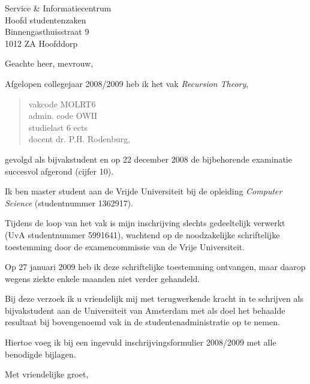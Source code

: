 \documentclass[a4paper,11pt]{brief}
\date{8 juli 2009}
\begin{document}
\begin{letter}{Service \& Informatiecentrum\\
Hoofd studentenzaken\\
Binnengasthuisstraat 9\\
1012 ZA Hoofddorp}

\opening{Geachte heer, mevrouw,}

Afgelopen collegejaar 2008/2009 heb ik het vak \emph{Recursion Theory},
\begin{quote}
vakcode MOLRT6\\
admin. code OWII\\
studielast 6 ects\\
docent dr. P.H. Rodenburg,
\end{quote}
gevolgd als bijvakstudent en op 22 december 2008 de bijbehorende
examinatie succesvol afgerond (cijfer 10).

Ik ben master student aan de Vrijde Universiteit bij de opleiding
\emph{Computer Science} (studentnummer 1362917).

Tijdens de loop van het vak is mijn inschrijving slechts gedeeltelijk
verwerkt (UvA studentnummer 5991641), wachtend op de noodzakelijke
schriftelijke toestemming door de examencommissie van de Vrije
Universiteit.

Op 27 januari 2009 heb ik deze schriftelijke toestemming ontvangen,
maar daarop wegens ziekte enkele maanden niet verder gehandeld.

Bij deze verzoek ik u vriendelijk mij met terugwerkende kracht in te
schrijven als bijvakstudent aan de Universiteit van Amsterdam met als
doel het behaalde resultaat bij bovengenoemd vak in de studentenadministratie
op te nemen.

Hiertoe voeg ik bij een ingevuld inschrijvingsformulier 2008/2009 met
alle benodigde bijlagen.

\closing{Met vriendelijke groet,}

\end{letter}
\end{document}
